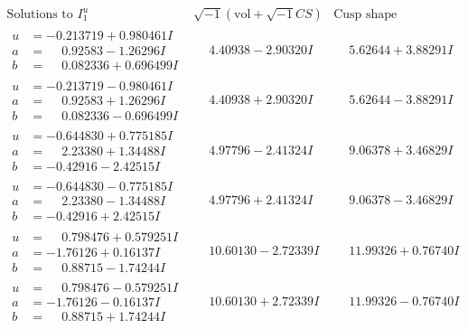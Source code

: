 \documentclass[1p]{elsarticle_modified}
\theoremstyle{definition}
\newcommand{\I}{\sqrt{-1}}
\begin{document}
$$\begin{array}{c|c|c}  
\text{Solutions to }I^u_{1}& \I (\text{vol} + \sqrt{-1}CS) & \text{Cusp shape}\\
 \hline 
\begin{aligned}
u &= -0.213719 + 0.980461 I \\
a &= \phantom{-}0.92583 - 1.26296 I \\
b &= \phantom{-}0.082336 + 0.696499 I\end{aligned}
 & \phantom{-}4.40938 - 2.90320 I & \phantom{-}5.62644 + 3.88291 I \\ \hline\begin{aligned}
u &= -0.213719 - 0.980461 I \\
a &= \phantom{-}0.92583 + 1.26296 I \\
b &= \phantom{-}0.082336 - 0.696499 I\end{aligned}
 & \phantom{-}4.40938 + 2.90320 I & \phantom{-}5.62644 - 3.88291 I \\ \hline\begin{aligned}
u &= -0.644830 + 0.775185 I \\
a &= \phantom{-}2.23380 + 1.34488 I \\
b &= -0.42916 - 2.42515 I\end{aligned}
 & \phantom{-}4.97796 - 2.41324 I & \phantom{-}9.06378 + 3.46829 I \\ \hline\begin{aligned}
u &= -0.644830 - 0.775185 I \\
a &= \phantom{-}2.23380 - 1.34488 I \\
b &= -0.42916 + 2.42515 I\end{aligned}
 & \phantom{-}4.97796 + 2.41324 I & \phantom{-}9.06378 - 3.46829 I \\ \hline\begin{aligned}
u &= \phantom{-}0.798476 + 0.579251 I \\
a &= -1.76126 + 0.16137 I \\
b &= \phantom{-}0.88715 - 1.74244 I\end{aligned}
 & \phantom{-}10.60130 - 2.72339 I & \phantom{-}11.99326 + 0.76740 I \\ \hline\begin{aligned}
u &= \phantom{-}0.798476 - 0.579251 I \\
a &= -1.76126 - 0.16137 I \\
b &= \phantom{-}0.88715 + 1.74244 I\end{aligned}
 & \phantom{-}10.60130 + 2.72339 I & \phantom{-}11.99326 - 0.76740 I \\ \hline\begin{aligned}

\end{aligned}
\end{array}$$
\end{document}

